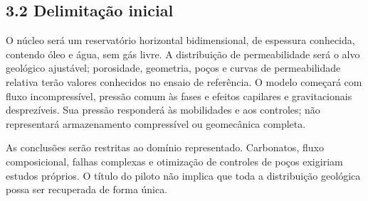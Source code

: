 \documentclass[12pt,a4paper]{article}
\begin{document}
\subsection*{3.2 Delimitação inicial}
O núcleo será um reservatório horizontal bidimensional, de espessura conhecida, contendo óleo e água, sem gás livre. A distribuição de permeabilidade será o alvo geológico ajustável; porosidade, geometria, poços e curvas de permeabilidade relativa terão valores conhecidos no ensaio de referência. O modelo começará com fluxo incompressível, pressão comum às fases e efeitos capilares e gravitacionais desprezíveis. Sua pressão responderá às mobilidades e aos controles; não representará armazenamento compressível ou geomecânica completa.\par
As conclusões serão restritas ao domínio representado. Carbonatos, fluxo composicional, falhas complexas e otimização de controles de poços exigiriam estudos próprios. O título do piloto não implica que toda a distribuição geológica possa ser recuperada de forma única.\par

\newpage
\end{document}
